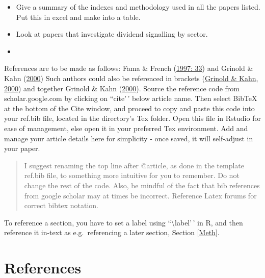 \documentclass[11pt,preprint, authoryear]{elsarticle}
\numberwithin{equation}{section}
\numberwithin{figure}{section}
\numberwithin{table}{section}
\def\tightlist{} %
\begin{document}
\begin{itemize}
\tightlist
\item
  Give a summary of the indexes and methodology used in all the papers
  listed. Put this in excel and make into a table.
\item
  Look at papers that investigate dividend signalling by sector.
\item
\end{itemize}

References are to be made as follows: Fama \& French
(\protect\hyperlink{ref-fama1997}{1997: 33}) and Grinold \& Kahn
(\protect\hyperlink{ref-grinold2000}{2000}) Such authors could also be
referenced in brackets (\protect\hyperlink{ref-grinold2000}{Grinold \&
Kahn, 2000}) and together Grinold \& Kahn
(\protect\hyperlink{ref-grinold2000}{2000}). Source the reference code
from scholar.google.com by clicking on ``cite'\,' below article name.
Then select BibTeX at the bottom of the Cite window, and proceed to copy
and paste this code into your ref.bib file, located in the directory's
Tex folder. Open this file in Rstudio for ease of management, else open
it in your preferred Tex environment. Add and manage your article
details here for simplicity - once saved, it will self-adjust in your
paper.

\begin{quote}
I suggest renaming the top line after @article, as done in the template
ref.bib file, to something more intuitive for you to remember. Do not
change the rest of the code. Also, be mindful of the fact that bib
references from google scholar may at times be incorrect. Reference
Latex forums for correct bibtex notation.
\end{quote}

To reference a section, you have to set a label using
``\textbackslash label'\,' in R, and then reference it in-text as
e.g.~referencing a later section, Section \ref{Meth}.

\newpage

\hypertarget{references}{%
\section*{References}\label{references}}
\end{document}

